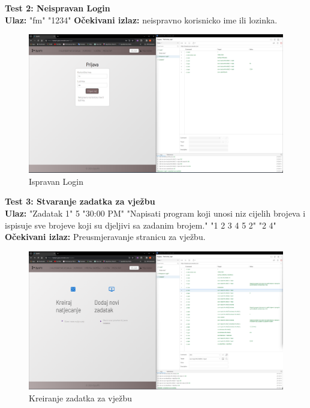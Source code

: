 			 
			 \textbf{Test 2: Neispravan Login}\\
			 \textbf{Ulaz:} "fm" "1234" 
			 \textbf{Očekivani izlaz:} neispravno korisnicko ime ili lozinka. 
			 
			 \begin{figure}[H]
			 	\includegraphics[scale=0.2]{slike/ispitTest2}
			 	\centering
			 	\caption{Ispravan Login}
			 	\label{fig:ispitest2}
			 \end{figure}
			 
			 \textbf{Test 3: Stvaranje zadatka za vježbu}\\
			 \textbf{Ulaz:} "Zadatak 1" 5 "30:00 PM" "Napisati program koji unosi niz cijelih brojeva i ispisuje sve brojeve koji su djeljivi sa zadanim brojem." "1 2 3 4 5  2" "2 4"
			 \textbf{Očekivani izlaz:} Preusmjeravanje stranicu za vježbu. 
			 
			 \begin{figure}[H]
			 	\includegraphics[scale=0.2]{slike/ispitTest3}
			 	\centering
			 	\caption{Kreiranje zadatka za vježbu}
			 	\label{fig:ispitest3}
			 \end{figure}
			 
